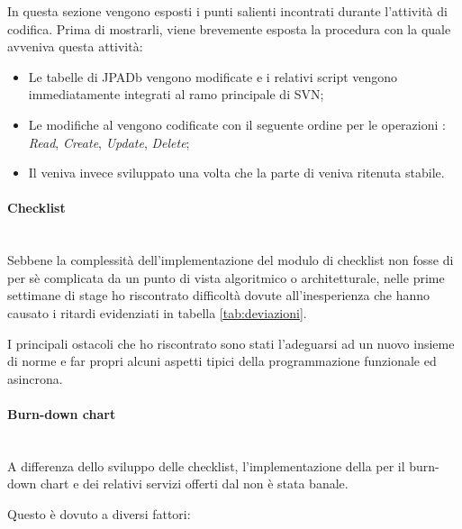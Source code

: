 In questa sezione vengono esposti i punti salienti incontrati durante
l'attività di codifica. Prima di mostrarli, viene brevemente esposta la
procedura con la quale avveniva questa attività:

\begin{itemize}
\item Le tabelle di JPADb vengono modificate e i relativi script vengono
  immediatamente integrati al ramo principale di SVN;
\item Le modifiche al \BKEND{} vengono codificate con il seguente ordine per le
  operazioni : \emph{Read}, \emph{Create}, \emph{Update},
  \emph{Delete};
\item Il \FREND{} veniva invece sviluppato una volta che la parte di \BKEND{}
  veniva ritenuta stabile.
\end{itemize}

\paragraph{Checklist} \mbox{} \\

Sebbene la complessità dell'implementazione del modulo di checklist non fosse
di per sè complicata da un punto di vista algoritmico o architetturale, nelle
prime settimane di stage ho riscontrato difficoltà dovute all'inesperienza che
hanno causato i ritardi evidenziati in tabella \ref{tab:deviazioni}.

I principali ostacoli che ho riscontrato sono stati l'adeguarsi ad un nuovo
insieme di norme e far propri alcuni aspetti tipici della programmazione
funzionale ed asincrona.

\paragraph{Burn-down chart} \mbox{} \\

A differenza dello sviluppo delle checklist, l'implementazione della
 per il burn-down chart e dei relativi servizi offerti dal
\BKEND{} non è stata banale.

Questo è dovuto a diversi fattori:

